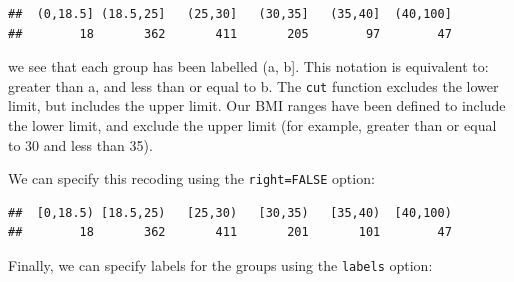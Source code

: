 \documentclass[
]{memoir}
\newenvironment{Shaded}{\begin{snugshade}}{\end{snugshade}}
\newcommand{\AttributeTok}[1]{\textcolor[rgb]{0.77,0.63,0.00}{#1}}
\newcommand{\ConstantTok}[1]{\textcolor[rgb]{0.00,0.00,0.00}{#1}}
\newcommand{\DecValTok}[1]{\textcolor[rgb]{0.00,0.00,0.81}{#1}}
\newcommand{\FloatTok}[1]{\textcolor[rgb]{0.00,0.00,0.81}{#1}}
\newcommand{\FunctionTok}[1]{\textcolor[rgb]{0.00,0.00,0.00}{#1}}
\newcommand{\NormalTok}[1]{#1}
\newcommand{\OtherTok}[1]{\textcolor[rgb]{0.56,0.35,0.01}{#1}}
\newcommand{\SpecialCharTok}[1]{\textcolor[rgb]{0.00,0.00,0.00}{#1}}
\begin{document}
\begin{Shaded}
\end{Shaded}

\begin{verbatim}
##  (0,18.5] (18.5,25]   (25,30]   (30,35]   (35,40]  (40,100] 
##        18       362       411       205        97        47
\end{verbatim}

we see that each group has been labelled (a, b{]}. This notation is equivalent to: greater than a, and less than or equal to b. The \texttt{cut} function excludes the lower limit, but includes the upper limit. Our BMI ranges have been defined to include the lower limit, and exclude the upper limit (for example, greater than or equal to 30 and less than 35).

We can specify this recoding using the \texttt{right=FALSE} option:

\begin{Shaded}
\end{Shaded}

\begin{verbatim}
##  [0,18.5) [18.5,25)   [25,30)   [30,35)   [35,40)  [40,100) 
##        18       362       411       201       101        47
\end{verbatim}

Finally, we can specify labels for the groups using the \texttt{labels} option:
\end{document}

